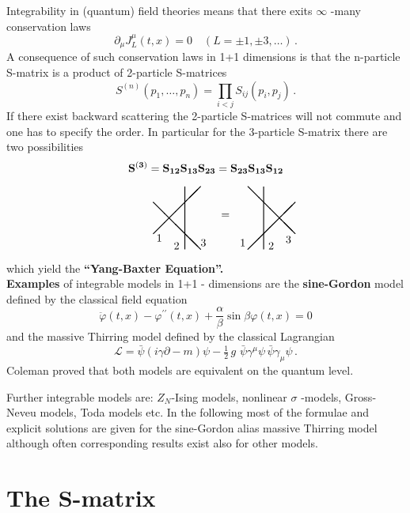\documentclass[a4paper,12pt]{article}
\begin{document}
Integrability in (quantum) field theories means that there exits $\infty $%
-many conservation laws 
\[
\partial _{\mu }J_{L}^{\mu }(t,x)=0\quad (L=\pm 1,\pm 3,\dots )\,. 
\]
A consequence of such conservation laws in 1+1 dimensions is that the
n-particle S-matrix is a product of 2-particle S-matrices 
\[
S^{(n)}(p_{1},\dots ,p_{n})=\prod_{i<j}S_{ij}(p_{i},p_{j})\,. 
\]
If there exist backward scattering the 2-particle S-matrices will not
commute and one has to specify the order. In particular for the 3-particle
S-matrix there are two possibilities 
\begin{gather*}
\mathbf{S^{(3)}=S_{12}S_{13}S_{23}=S_{23}S_{13}S_{12}} \\[2mm]
~~~~~~~~~~ 
\begin{array}{c}
\unitlength5mm\begin{picture}(9,4) \thicklines \put(0,1){\line(1,1){3}}
\put(0,3){\line(1,-1){3}} \put(2,0){\line(0,1){4}} \put(4.3,2){$=$}
\put(6,0){\line(1,1){3}} \put(6,4){\line(1,-1){3}} \put(7,0){\line(0,1){4}}
\put(.2,.5){$1$} \put(1.3,0){$2$} \put(3,.2){$3$} \put(5.5,.2){$1$}
\put(7.3,0){$2$} \put(8.4,.4){$3$} \end{picture}
\end{array}
\end{gather*}
which yield the \textbf{``Yang-Baxter Equation''.}\\[3pt]
\textbf{Examples }of integrable models in 1+1 - dimensions are the \textbf{%
sine-Gordon} model defined by the classical field equation 
\[
\ddot{\varphi}(t,x)-\varphi ^{\prime \prime }(t,x)+\frac{\alpha }{\beta }%
\sin \beta \varphi (t,x)=0 
\]
and the massive Thirring model defined by the classical Lagrangian 
\[
\mathcal{L}=\bar{\psi}(i\gamma \partial -m)\psi -\tfrac{1}{2}\,g\,\,\bar{\psi%
}\gamma ^{\mu }\psi \,\bar{\psi}\gamma _{\mu }\psi \,. 
\]
Coleman \cite{Co} proved that both models are equivalent on the quantum level.

Further integrable models are: $Z_{N}$-Ising models, nonlinear $\sigma $%
-models, Gross-Neveu models, Toda models etc. In the following most of the
formulae and explicit solutions are given for the sine-Gordon alias massive
Thirring model although often corresponding results exist also for other
models.

\section{The S-matrix}
\end{document}
